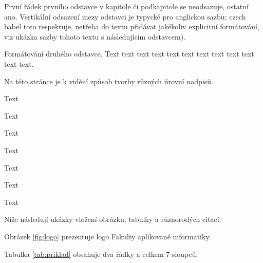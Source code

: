 
První řádek prvního odstavce v kapitole či podkapitole se neodsazuje, ostatní ano. Vertikální odsazení mezy odstavci je typycké pro anglickou sazbu; czech babel toto respektuje, netřeba do textu přidávat jakékoliv explicitní formátování, viz ukázka sazby tohoto textu s následujícím odstavcem).

Formátování druhého odstavce. Text text text text text text text text text text text text.



Na této stránce je k vidění způsob tvorby různých úrovní nadpisů.

Text

Text

Text

Text

Text

Text

Text


Níže následují ukázky vložení obrázku, tabulky a různorodých citací.


Obrázek \ref{fig:logo} prezentuje logo Fakulty aplikované informatiky.



Tabulka \ref{tab:priklad} obsahuje dva řádky a celkem 7 sloupců.




